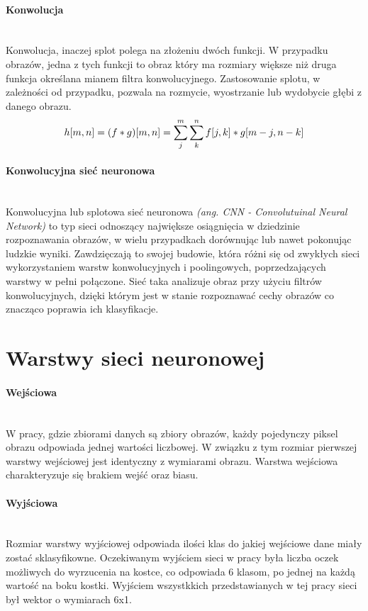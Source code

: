 \paragraph{Konwolucja} \mbox{}\\
Konwolucja, inaczej splot polega na złożeniu dwóch funkcji. W przypadku obrazów,
jedna z tych funkcji to obraz który ma rozmiary większe niż druga funkcja określana
mianem filtra konwolucyjnego. Zastosowanie splotu, w zależności od przypadku,
pozwala na rozmycie, wyostrzanie lub wydobycie głębi z danego obrazu.
\begin{equation}
h[m, n] = (f * g)[m, n] = \sum_j^m \sum_k^n f[j, k] * g[m-j, n-k] \\
\end{equation}

\paragraph{Konwolucyjna sieć neuronowa} \mbox{}\\
Konwolucyjna lub splotowa sieć neuronowa \textit{(ang. CNN - Convolutuinal Neural Network)}
to typ sieci odnoszący największe osiągnięcia w dziedzinie rozpoznawania obrazów,
w wielu przypadkach dorównując lub nawet pokonując ludzkie wyniki. Zawdzięczają to
swojej budowie, która różni się od zwykłych sieci wykorzystaniem warstw konwolucyjnych
i poolingowych, poprzedzających warstwy w pełni połączone. Sieć taka analizuje obraz
przy użyciu filtrów konwolucyjnych, dzięki którym jest w stanie rozpoznawać cechy
obrazów co znacząco poprawia ich klasyfikacje.

\section{Warstwy sieci neuronowej}
\paragraph{Wejściowa}  \mbox{}\\
W pracy, gdzie zbiorami danych są zbiory obrazów, każdy pojedynczy piksel obrazu
odpowiada jednej wartości liczbowej. W związku z tym rozmiar pierwszej warstwy
wejściowej jest identyczny z wymiarami obrazu. Warstwa wejściowa charakteryzuje się
brakiem wejść oraz biasu.

\paragraph{Wyjściowa}  \mbox{}\\
Rozmiar warstwy wyjściowej odpowiada ilości klas do jakiej wejściowe dane miały
zostać sklasyfikowne. Oczekiwanym wyjściem sieci w pracy była liczba oczek możliwych
do wyrzucenia na kostce, co odpowiada 6 klasom, po jednej na każdą wartość na boku
kostki. Wyjściem wszystkkich przedstawianych w tej pracy sieci był wektor o wymiarach
6x1.

